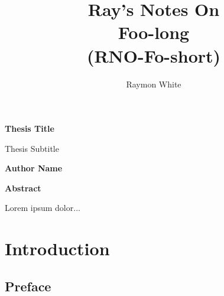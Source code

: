 \documentclass[12pt,a4paper]{report}
\author{Raymon White}
\title{Ray's Notes On \\ 
       Foo-long\\
       (RNO-Fo-short)}
\begin{document}







\thispagestyle{plain}
\begin{center}
  \Large
  \textbf{Thesis Title}
    
  \vspace{0.4cm}
  \large
  Thesis Subtitle
  
  \vspace{0.4cm}
  \textbf{Author Name}
  
  \vspace{0.9cm}
  \textbf{Abstract}
\end{center}
Lorem ipsum dolor...






\chapter[Introduction]
{Introduction
  \label{ch0introduction}}

\section{Preface}
\end{document}
